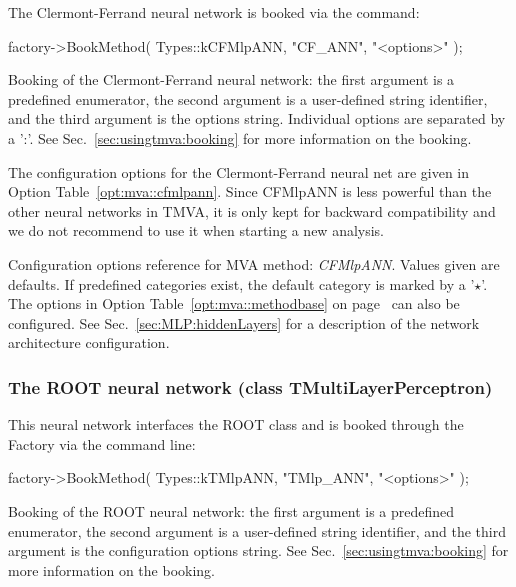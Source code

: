 The Clermont-Ferrand neural network is booked via the command:
\begin{codeexample}
\begin{tmvacode}
factory->BookMethod( Types::kCFMlpANN, "CF_ANN", "<options>" );
\end{tmvacode}
\caption[.]{\codeexampleCaptionSize Booking of the Clermont-Ferrand neural network: the first 
            argument is a predefined enumerator, the second argument is a user-defined string 
            identifier, and the third argument is the options string.
            Individual options are separated by a ':'. 
            See Sec.~\ref{sec:usingtmva:booking} for more information on the booking.}
\end{codeexample}

The configuration options for the Clermont-Ferrand neural net are given
in Option Table~\ref{opt:mva::cfmlpann}. Since CFMlpANN is less powerful than the other neural networks in TMVA, it is only kept for backward compatibility and we do not recommend to use it when starting a new analysis.

\begin{option}[t]

\caption[.]{\optionCaptionSize 
     Configuration options reference for MVA method: {\em CFMlpANN}.
     Values given are defaults. If predefined categories exist, the default category 
     is marked by a '$\star$'. The options in Option Table~\ref{opt:mva::methodbase} on 
     page~\pageref{opt:mva::methodbase} can also be configured.     
     See Sec.~\ref{sec:MLP:hiddenLayers} for a description of the 
     network architecture configuration.
}
\label{opt:mva::cfmlpann}
\end{option}

\subsubsection*{The ROOT neural network 
                (class TMultiLayerPerceptron)}

This neural network interfaces the ROOT class  and is
booked through the Factory via the command line:
\begin{codeexample}
\begin{tmvacode}
factory->BookMethod( Types::kTMlpANN, "TMlp_ANN", "<options>" );
\end{tmvacode}
\caption[.]{\codeexampleCaptionSize Booking of the ROOT neural network: the 
            first argument is a predefined enumerator, the second argument is a 
            user-defined string identifier, and the third argument is the configuration 
            options string. See Sec.~\ref{sec:usingtmva:booking} for more information on 
            the booking.}
\end{codeexample}

